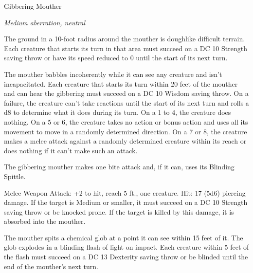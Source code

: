 \begin{monsterbox}{Gibbering Mouther}
\begin{hangingpar}
\textit{Medium aberration, neutral}
\end{hangingpar}
\dndline%
\basics[%
armorclass = 9,
hitpoints = 9d8 + 27,
speed = {10 ft., swim 10 ft.}
]
\dndline%
\stats[%
STR = \stat{10},
DEX = \stat{8},
CON = \stat{16},
INT = \stat{3},
WIS = \stat{10},
CHA = \stat{6}
]
\dndline%
\details[%
skills={},
damageimmunities={},
savingthrows={},
conditionimmunities={prone},
damageresistances={},
damagevulnerabilities={},
senses={darkvision 60 ft., passive Perception 10},
challenge=2
]
\dndline%
\begin{monsteraction}
The ground in a 10-foot radius around the mouther is doughlike difficult terrain. Each creature that starts its turn in that area must succeed on a DC 10 Strength saving throw or have its speed reduced to 0 until the start of its next turn.
\end{monsteraction}
\begin{monsteraction}[Gibbering]
The mouther babbles incoherently while it can see any creature and isn't incapacitated. Each creature that starts its turn within 20 feet of the mouther and can hear the gibbering must succeed on a DC 10 Wisdom saving throw. On a failure, the creature can't take reactions until the start of its next turn and rolls a d8 to determine what it does during its turn. On a 1 to 4, the creature does nothing. On a 5 or 6, the creature takes no action or bonus action and uses all its movement to move in a randomly determined direction. On a 7 or 8, the creature makes a melee attack against a randomly determined creature within its reach or does nothing if it can't make such an attack.
\end{monsteraction}
\begin{monsteraction}[Multiattack]
The gibbering mouther makes one bite attack and, if it can, uses its Blinding Spittle.
\end{monsteraction}
\begin{monsteraction}[Bites]
Melee Weapon Attack: +2 to hit, reach 5 ft., one creature. Hit: 17 (5d6) piercing damage. If the target is Medium or smaller, it must succeed on a DC 10 Strength saving throw or be knocked prone. If the target is killed by this damage, it is absorbed into the mouther.
\end{monsteraction}
\begin{monsteraction}
The mouther spits a chemical glob at a point it can see within 15 feet of it. The glob explodes in a blinding flash of light on impact. Each creature within 5 feet of the flash must succeed on a DC 13 Dexterity saving throw or be blinded until the end of the mouther's next turn.
\end{monsteraction}
\end{monsterbox}